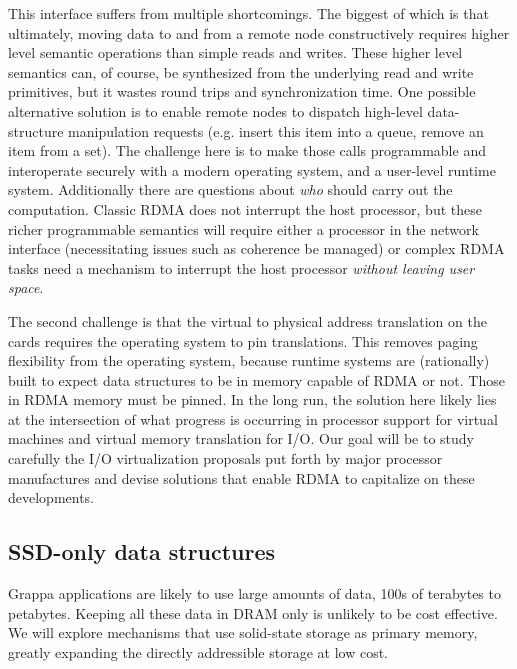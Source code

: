 This interface suffers from multiple shortcomings.  The biggest of which is that ultimately, moving data to and from a remote node constructively requires higher level semantic operations than simple reads and writes.  These higher level semantics can, of course, be synthesized from the underlying read and write primitives, but it wastes round trips and synchronization time.  One possible alternative solution is to enable remote nodes to dispatch high-level data-structure manipulation requests (e.g. insert this item into a queue, remove an item from a set).  The challenge here is to make those calls programmable and interoperate securely with a modern operating system, and a user-level runtime system.  Additionally there are questions about \emph{who} should carry out the computation.  Classic RDMA does not interrupt the host processor, but these richer programmable semantics will require either a processor in the network interface (necessitating issues such as coherence be managed) or complex RDMA tasks need a mechanism to interrupt the host processor \emph{without leaving user space}. 


The second challenge is that the virtual to physical address translation on the cards requires the operating system to pin translations.  This removes paging flexibility from the operating system, because runtime systems are (rationally) built to expect data structures to be in memory capable of RDMA or not.  Those in RDMA memory must be pinned.  In the long run, the solution here likely lies at the intersection of what progress is occurring in processor support for virtual machines and virtual memory translation for I/O.  Our goal will be to study carefully the I/O virtualization proposals put forth by major processor manufactures and devise solutions that enable RDMA to capitalize on these developments.

\subsection{SSD-only data structures}

Grappa applications are likely to use large amounts of data, 100s of terabytes to petabytes. Keeping all these data in DRAM only is unlikely to be cost effective. We will explore mechanisms that use solid-state storage as primary memory, greatly expanding the directly addressible storage at low cost.

